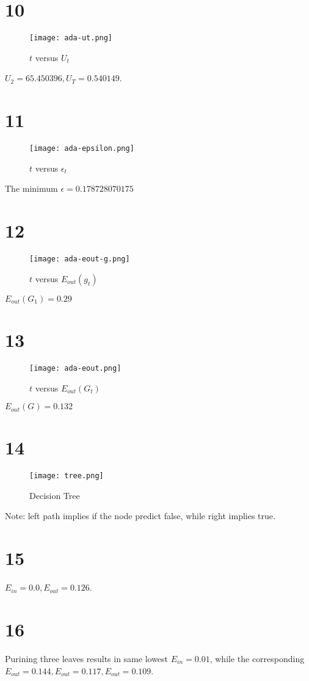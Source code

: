 \documentclass[fleqn,a4paper,12pt]{article}
\begin{document}
\section*{10}

\begin{figure}[H]
\centering
\texttt{[image: ada-ut.png]}
\caption{$t$ versus $U_t$}
\label{fig:ada-ut}
\end{figure}

$U_2 = 65.450396, U_T = 0.540149$.

\section*{11}

\begin{figure}[H]
\centering
\texttt{[image: ada-epsilon.png]}
\caption{$t$ versus $\epsilon_t$}
\label{fig:ada-ut}
\end{figure}

The minimum $\epsilon = 0.178728070175$


\section*{12}

\begin{figure}[H]
\centering
\texttt{[image: ada-eout-g.png]}
\caption{$t$ versus $E_{out}(g_t)$}
\label{fig:ada-eout-g}
\end{figure}

$E_{out}(G_1) = 0.29$

\section*{13}

\begin{figure}[H]
\centering
\texttt{[image: ada-eout.png]}
\caption{$t$ versus $E_{out}(G_t)$}
\label{fig:ada-eout}
\end{figure}

$E_{out}(G) = 0.132$

\section*{14}

\begin{figure}[H]
\centering
\texttt{[image: tree.png]}
\caption{Decision Tree}
\label{fig:tree}
\end{figure}

Note: left path implies if the node predict false, while right implies true.

\section*{15}

$E_{in} = 0.0, E_{out} = 0.126$.

\section*{16}

Purining three leaves results in same lowest $E_{in} = 0.01$, while the corresponding $E_{out} = 0.144, E_{out} = 0.117, E_{out} = 0.109$.
\end{document}
